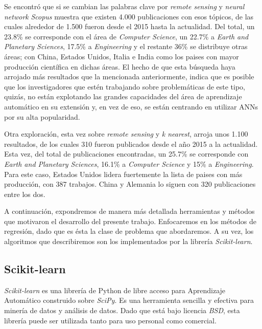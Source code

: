   \par Se encontró que si se cambian las palabras clave por
    \textit{remote sensing} y \textit{neural network} \textit{Scopus} muestra
    que existen 4.000 publicaciones con esos tópicos, de las cuales alrededor de
    1.500 fueron desde el 2015 hasta la actualidad. Del total, un 23.8\% se
    corresponde con el área de \textit{Computer Science}, un 22.7\% a
    \textit{Earth and Planetary Sciences}, 17.5\% a \textit{Engineering} y el
    restante 36\% se distribuye otras áreas; con China,
    Estados Unidos, Italia e India como los paises con mayor producción
    científica en dichas áreas.
    El hecho de que esta búsqueda haya arrojado más resultados que la mencionada
    anteriormente, indica que es posible que los investigadores que estén trabajando
    sobre problemáticas de este tipo, quizás, no están explotando las grandes
    capacidades del área de aprendizaje automático en su extensión y, en vez de
    eso, se están centrando en utilizar ANNs por su alta popularidad.

  \par Otra exploración, esta vez sobre \textit{remote sensing} y \textit{k nearest},
    arroja unos 1.100 resultados, de los cuales 310 fueron publicados desde
    el año 2015 a la actualidad. Esta vez, del total de publicaciones encontradas,
    un 25.7\% se corresponde con \textit{Earth and Planetary Sciences}, 16.1\%
    a \textit{Computer Science} y 15\% a \textit{Engineering}. Para este caso,
    Estados Unidos lidera fuertemente la lista de paises con más producción,
    con 387 trabajos. China y Alemania lo siguen con 320 publicaciones entre
    los dos.


  \par A continuación, expondremos de manera más detallada
    herramientas y métodos que motivaron el desarrollo del presente
    trabajo. Enfocaremos en los métodos de regresión, dado que es ésta la clase
    de problema que abordaremos. A su vez, los algoritmos que describiremos son
    los implementados por la librería \textit{Scikit-learn}.

\subsection{Scikit-learn}

  \par \textit{Scikit-learn}\cite{scikit-learn, sklearn_review} es una librería
    de Python de libre acceso para Aprendizaje Automático
    construido sobre \textit{SciPy}\cite{scipy}. Es una herramienta
    sencilla y efectiva para minería de datos y análisis de datos. Dado que está bajo
    licencia \textit{BSD}, esta librería puede ser utilizada tanto
    para uso personal como comercial.

